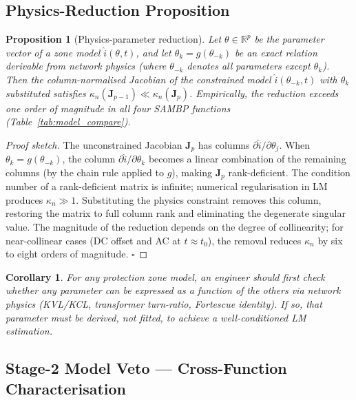 \documentclass[journal,twoside,10pt]{IEEEtran}
\newtheorem{proposition}{Proposition}
\newtheorem{corollary}{Corollary}
\begin{document}
\subsection{Physics-Reduction Proposition}
\label{sec:comparison:prop}

\begin{proposition}[Physics-parameter reduction]
\label{prop:reduction}
Let $\theta \in \mathbb{R}^p$ be the parameter vector of a zone model
$\hat{i}(\theta,t)$, and let $\theta_k = g(\theta_{-k})$ be an exact
relation derivable from network physics (where $\theta_{-k}$ denotes all
parameters except $\theta_k$).
Then the column-normalised Jacobian of the constrained model
$\hat{i}(\theta_{-k},t)$ with $\theta_k$ substituted satisfies
$\kappa_n(\mathbf{J}_{p-1}) \ll \kappa_n(\mathbf{J}_p)$.
Empirically, the reduction exceeds one order of magnitude in all four
SAMBP functions (Table~\ref{tab:model_compare}).
\end{proposition}

\begin{proof}[Proof sketch]
The unconstrained Jacobian $\mathbf{J}_p$ has columns
$\partial\hat{i}/\partial\theta_j$.
When $\theta_k = g(\theta_{-k})$, the column
$\partial\hat{i}/\partial\theta_k$ becomes a linear combination of the
remaining columns (by the chain rule applied to $g$), making
$\mathbf{J}_p$ rank-deficient.
The condition number of a rank-deficient matrix is infinite; numerical
regularisation in LM produces $\kappa_n \gg 1$.
Substituting the physics constraint removes this column, restoring
the matrix to full column rank and eliminating the degenerate singular
value.
The magnitude of the reduction depends on the degree of collinearity;
for near-collinear cases (DC offset and AC at $t \approx t_0$), the
removal reduces $\kappa_n$ by six to eight orders of magnitude.
$\square$
\end{proof}

\begin{corollary}
For any protection zone model, an engineer should first check whether any
parameter can be expressed as a function of the others via network physics
(KVL/KCL, transformer turn-ratio, Fortescue identity).
If so, that parameter must be derived, not fitted, to achieve a
well-conditioned LM estimation.
\end{corollary}

\subsection{Stage-2 Model Veto — Cross-Function Characterisation}
\label{sec:comparison:veto}
\end{document}
